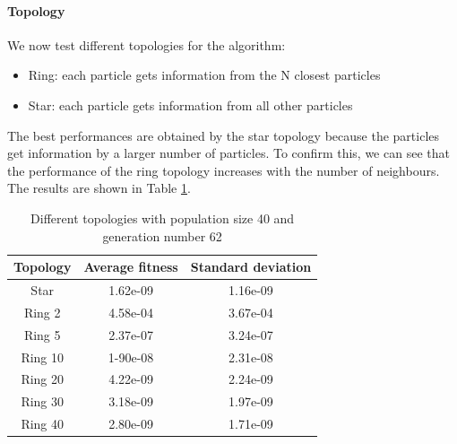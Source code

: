 \paragraph*{Topology}
We now test different topologies for the algorithm:
\begin{itemize}
    \item Ring: each particle gets information from the N closest particles
    \item Star: each particle gets information from all other particles
\end{itemize}
The best performances are obtained by the star topology because the particles get information by a larger number of particles. To confirm this, we can see that the performance of the ring topology increases with the number of neighbours. The results are shown in Table \ref{tab:pso-topology}.
\begin{table}
    \centering
    \begin{tabular}{|c|c|c|}
        Topology & Average fitness & Standard deviation \\ \hline
        Star     & 1.62e-09        & 1.16e-09           \\
        Ring 2   & 4.58e-04        & 3.67e-04           \\
        Ring 5   & 2.37e-07        & 3.24e-07           \\
        Ring 10  & 1-90e-08        & 2.31e-08           \\
        Ring 20  & 4.22e-09        & 2.24e-09           \\
        Ring 30  & 3.18e-09        & 1.97e-09           \\
        Ring 40  & 2.80e-09        & 1.71e-09           \\
    \end{tabular}
    \caption{Different topologies with population size 40 and generation number 62}
    \label{tab:pso-topology}
\end{table}